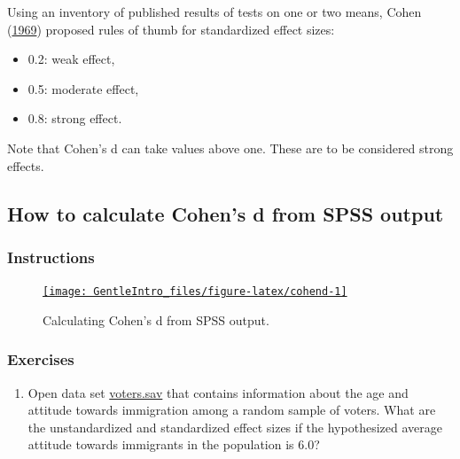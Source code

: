 \documentclass[a4paper]{book}
\providecommand{\tightlist}{%
  \setlength{\itemsep}{0pt}\setlength{\parskip}{0pt}}
\theoremstyle{definition}
\theoremstyle{definition}
\theoremstyle{definition}
\theoremstyle{remark}
\begin{document}
Using an inventory of published results of tests on one or two means,
Cohen (\protect\hyperlink{ref-RefWorks:3933}{1969}) proposed rules of
thumb for standardized effect sizes:

\begin{itemize}
\item
  0.2: weak effect,
\item
  0.5: moderate effect,
\item
  0.8: strong effect.
\end{itemize}

Note that Cohen's d can take values above one. These are to be
considered strong effects.

\subsection{How to calculate Cohen's d from SPSS
output}\label{how-to-calculate-cohens-d-from-spss-output}

\subsubsection{Instructions}\label{instructions-3}

\begin{figure}[H]
\href{https://www.youtube.com/embed/2TSuu6WpcUo}{\texttt{[image: GentleIntro\_files/figure-latex/cohend-1]} }\caption{Calculating Cohen's d from SPSS output.}\label{fig:cohend}
\end{figure}

\subsubsection{Exercises}\label{exercises-4}

\begin{enumerate}
\def\labelenumi{\arabic{enumi}.}
\tightlist
\item
  Open data set
  \href{http://82.196.4.233:3838/data/voters.sav}{voters.sav} that
  contains information about the age and attitude towards immigration
  among a random sample of voters. What are the unstandardized and
  standardized effect sizes if the hypothesized average attitude towards
  immigrants in the population is 6.0?
\end{enumerate}
\end{document}

